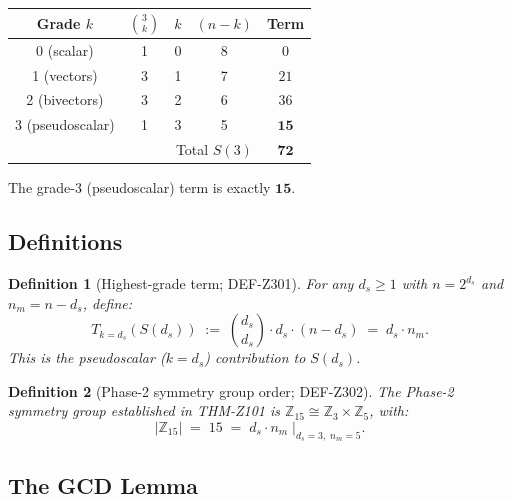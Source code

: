 \documentclass[12pt, a4paper]{article}
\newtheorem{definition}{Definition}[section]
\begin{document}
\begin{center}
{\small
\renewcommand{\arraystretch}{1.3}
\begin{tabular}{ccccc}
\toprule
Grade $k$ & $\binom{3}{k}$ & $k$ & $(n-k)$ & Term \\
\midrule
0 (scalar)      & 1 & 0 & 8 & $0$ \\
1 (vectors)     & 3 & 1 & 7 & $21$ \\
2 (bivectors)   & 3 & 2 & 6 & $36$ \\
3 (pseudoscalar)& 1 & 3 & 5 & $\mathbf{15}$ \\
\midrule
\multicolumn{4}{r}{Total $S(3)$} & $\mathbf{72}$ \\
\bottomrule
\end{tabular}
}
\end{center}

The grade-3 (pseudoscalar) term is exactly $\mathbf{15}$.

\subsection{Definitions}
\label{sec:defs}

\begin{definition}[Highest-grade term; DEF-Z301]
\label{def:Tds}
For any $d_s \geq 1$ with $n = 2^{d_s}$ and $n_m = n - d_s$, define:
\begin{equation}
  T_{k=d_s}(S(d_s))
  \;:=\; \binom{d_s}{d_s}\cdot d_s \cdot (n - d_s)
  \;=\; d_s \cdot n_m.
  \label{eq:Tds-def}
\end{equation}
This is the pseudoscalar ($k = d_s$) contribution to $S(d_s)$.
\end{definition}

\begin{definition}[Phase-2 symmetry group order; DEF-Z302]
\label{def:sym-order}
The Phase-2 symmetry group established in THM-Z101 is
$\mathbb{Z}_{15} \cong \mathbb{Z}_3 \times \mathbb{Z}_5$, with:
\begin{equation}
  |\mathbb{Z}_{15}| \;=\; 15 \;=\; d_s \cdot n_m
  \;\Big|_{d_s=3,\; n_m=5}.
  \label{eq:sym-order}
\end{equation}
\end{definition}

\subsection{The GCD Lemma}
\label{sec:gcd}
\end{document}
